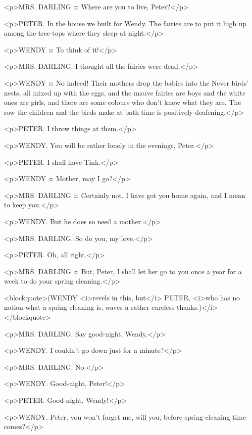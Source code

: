 
<p>MRS. DARLING ¤
Where are you to live, Peter?</p>

<p>PETER. In the house we built for Wendy. The fairies are to put it high up among the tree-tops where they sleep at night.</p>

<p>WENDY ¤
To think of it!</p>

<p>MRS. DARLING. I thought all the fairies were dead.</p>

<p>WENDY ¤
No indeed! Their mothers drop the babies into the Never birds' nests, all mixed up with the eggs, and the mauve fairies are boys and the white ones are girls, and there are some colours who don't know what they are. The row the children and the birds make at bath time is positively deafening.</p>

<p>PETER. I throw things at them.</p>

<p>WENDY. You will be rather lonely in the evenings, Peter.</p>

<p>PETER. I shall have Tink.</p>

<p>WENDY ¤
Mother, may I go?</p>

<p>MRS. DARLING ¤
Certainly not. I have got you home again, and I mean to keep you.</p>

<p>WENDY. But he does so need a mother.</p>

<p>MRS. DARLING. So do you, my love.</p>

<p>PETER. Oh, all right.</p>

<p>MRS. DARLING ¤
But, Peter, I shall let her go to you once a year for a week to do your spring cleaning.</p>

<blockquote>(WENDY <i>revels in this, but</i> PETER, <i>who has no notion what a spring cleaning is, waves a rather careless thanks.)</i></blockquote>

<p>MRS. DARLING. Say good-night, Wendy.</p>

<p>WENDY. I couldn't go down just for a minute?</p>

<p>MRS. DARLING. No.</p>

<p>WENDY. Good-night, Peter!</p>

<p>PETER. Good-night, Wendy!</p>

<p>WENDY. Peter, you won't forget me, will you, before spring-cleaning time comes?</p>

